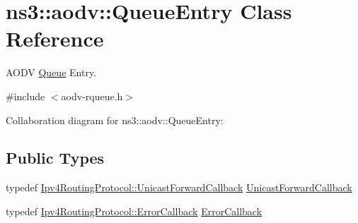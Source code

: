 \hypertarget{classns3_1_1aodv_1_1QueueEntry}{}\section{ns3\+:\+:aodv\+:\+:Queue\+Entry Class Reference}
\label{classns3_1_1aodv_1_1QueueEntry}


A\+O\+DV \hyperlink{classns3_1_1Queue}{Queue} Entry.  




{\ttfamily \#include $<$aodv-\/rqueue.\+h$>$}



Collaboration diagram for ns3\+:\+:aodv\+:\+:Queue\+Entry\+:
\subsection*{Public Types}
\begin{DoxyCompactItemize}
\item 
typedef \hyperlink{classns3_1_1Ipv4RoutingProtocol_a3453a85764cbbb1e704da7e919aa5d19}{Ipv4\+Routing\+Protocol\+::\+Unicast\+Forward\+Callback} \hyperlink{classns3_1_1aodv_1_1QueueEntry_ac0f936aaa2d2de7ba253755b56cecc65}{Unicast\+Forward\+Callback}
\item 
typedef \hyperlink{classns3_1_1Ipv4RoutingProtocol_a0348285418c30d5021b08f7a68af21ea}{Ipv4\+Routing\+Protocol\+::\+Error\+Callback} \hyperlink{classns3_1_1aodv_1_1QueueEntry_a0a8a6e41579672fb47dc7c9c7cbaf528}{Error\+Callback}
\end{DoxyCompactItemize}
